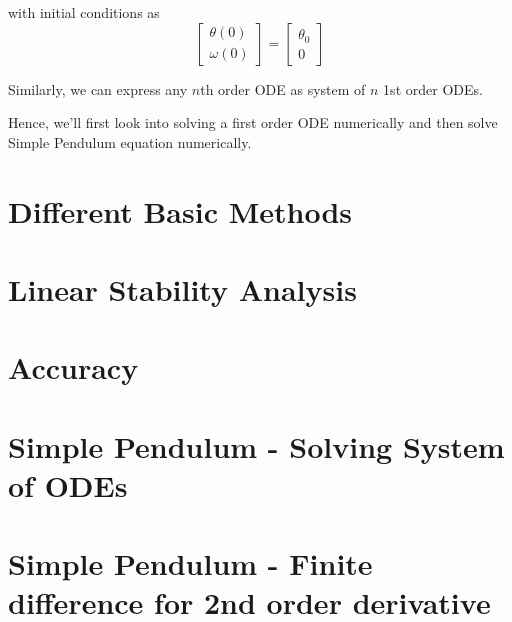 \documentclass[
]{book}
\begin{document}
with initial conditions as
\begin{equation}
\begin{bmatrix} \theta(0) \\  \omega(0) \end{bmatrix}=\begin{bmatrix} \theta_0 \\  0 \end{bmatrix}
\end{equation}

Similarly, we can express any \(n\)th order ODE as system of \(n\) 1st order ODEs.

Hence, we'll first look into solving a first order ODE numerically and then solve Simple Pendulum equation numerically.

\hypertarget{different-basic-methods}{%
\section{Different Basic Methods}\label{different-basic-methods}}

\hypertarget{linear-stability-analysis}{%
\section{Linear Stability Analysis}\label{linear-stability-analysis}}

\hypertarget{accuracy-1}{%
\section{Accuracy}\label{accuracy-1}}

\hypertarget{simple-pendulum---solving-system-of-odes}{%
\section{Simple Pendulum - Solving System of ODEs}\label{simple-pendulum---solving-system-of-odes}}

\hypertarget{simple-pendulum---finite-difference-for-2nd-order-derivative}{%
\section{Simple Pendulum - Finite difference for 2nd order derivative}\label{simple-pendulum---finite-difference-for-2nd-order-derivative}}

  
\end{document}

